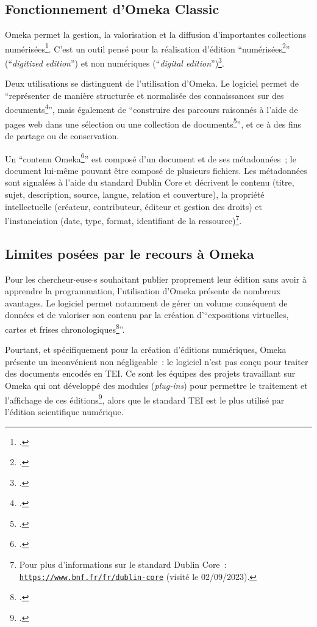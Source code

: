 \subsection{Fonctionnement d'Omeka Classic}
Omeka permet la gestion, la valorisation et la diffusion d'importantes collections numérisées\footcite[p.1]{Leblanc2020}. C'est un outil pensé pour la réalisation d'édition \enquote{numérisées\footcite[p.~27]{Sahle2016}} (\enquote{\textit{digitized edition}}) et non numériques (\enquote{\textit{digital edition}})\footcite[p.~2]{Leblanc2020}.  

Deux utilisations se distinguent de l'utilisation d'Omeka. Le logiciel permet de \enquote{représenter de manière structurée et normalisée des connaissances sur des documents\footcite[diapo 7]{Daussin2019}}, mais également de \enquote{construire des parcours raisonnés à l’aide de pages web dans une sélection ou une collection de
documents\footcite[diapo 7]{Daussin2019}}, et ce à des fins de partage ou de conservation.  

Un \enquote{contenu Omeka\footcite[diapo 8]{Daussin2019}} est composé d'un document et de ses métadonnées~; le document lui-même pouvant être composé de plusieurs fichiers. Les métadonnées sont signalées à l'aide du standard Dublin Core et décrivent le contenu (titre, sujet, description, source,  langue, relation et couverture), la propriété intellectuelle (créateur, contributeur, éditeur et gestion des droits) et l'instanciation (date, type, format, identifiant de la ressource)\footnote{Pour plus d'informations sur le standard Dublin Core~: \texttt{\href{https://www.bnf.fr/fr/dublin-core}{https://www.bnf.fr/fr/dublin-core}} (visité le 02/09/2023).}.


\subsection{Limites posées par le recours à Omeka}
Pour les chercheur$\cdot$euse$\cdot$s souhaitant publier proprement leur édition sans avoir à apprendre la programmation, l'utilisation d'Omeka présente de nombreux avantages. Le logiciel permet notamment de gérer un volume conséquent de données et de valoriser son contenu par la création d'\enquote{expositions virtuelles,  cartes et  frises chronologiques\footcite[p.~18-19]{Leblanc2020}}.  

Pourtant, et spécifiquement pour la création d'éditions numériques, Omeka présente un inconvénient non négligeable~: le logiciel n'est pas conçu pour traiter des documents encodés en TEI. Ce sont les équipes des projets travaillant sur Omeka qui ont développé des modules (\textit{plug-ins}) pour permettre le traitement et l'affichage de ces éditions\footcite[p.~4]{Leblanc2020}, alors que le standard TEI est le plus utilisé par l'édition scientifique numérique.  

